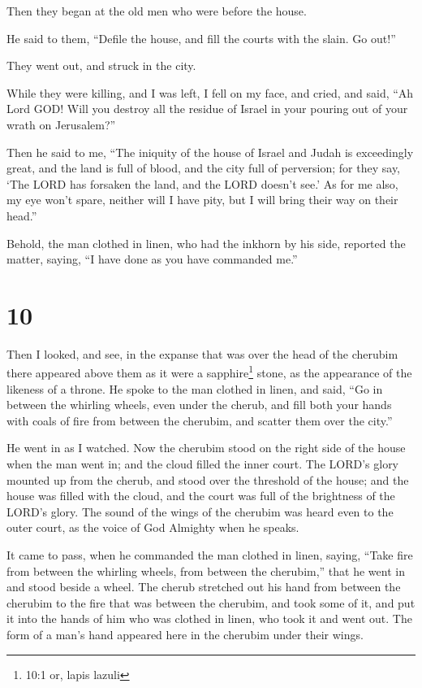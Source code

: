 Then they began at the old men who were before the house.

 He said to them, ``Defile the house, and fill the courts
with the slain. Go out!''

They went out, and struck in the city.

 While they were killing, and I was left, I fell on my face,
and cried, and said, ``Ah Lord GOD! Will you destroy all the residue of
Israel in your pouring out of your wrath on Jerusalem?''

 Then he said to me, ``The iniquity of the house of Israel
and Judah is exceedingly great, and the land is full of blood, and the
city full of perversion; for they say, `The LORD has forsaken the land,
and the LORD doesn't see.'  As for me also, my eye won't
spare, neither will I have pity, but I will bring their way on their
head.''

 Behold, the man clothed in linen, who had the inkhorn by
his side, reported the matter, saying, ``I have done as you have
commanded me.''

\hypertarget{section-8}{%
\section{10}\label{section-8}}

 Then I looked, and see, in the expanse that was over the
head of the cherubim there appeared above them as it were a
sapphire\footnote{10:1 or, lapis lazuli} stone, as the appearance of the
likeness of a throne.  He spoke to the man clothed in linen,
and said, ``Go in between the whirling wheels, even under the cherub,
and fill both your hands with coals of fire from between the cherubim,
and scatter them over the city.''

He went in as I watched.  Now the cherubim stood on the
right side of the house when the man went in; and the cloud filled the
inner court.  The LORD's glory mounted up from the cherub,
and stood over the threshold of the house; and the house was filled with
the cloud, and the court was full of the brightness of the LORD's glory.
 The sound of the wings of the cherubim was heard even to
the outer court, as the voice of God Almighty when he speaks.

 It came to pass, when he commanded the man clothed in
linen, saying, ``Take fire from between the whirling wheels, from
between the cherubim,'' that he went in and stood beside a wheel.
 The cherub stretched out his hand from between the cherubim
to the fire that was between the cherubim, and took some of it, and put
it into the hands of him who was clothed in linen, who took it and went
out.  The form of a man's hand appeared here in the cherubim
under their wings.

